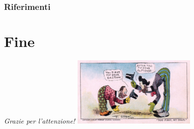 \documentclass{../libs/presentation_format}
\begin{document}

\begin{frame}[allowframebreaks]
    \frametitle{Riferimenti}
    \printbibliography
\end{frame}

\section{Fine}
\begin{frame}{}
	\huge\emph{Grazie per l'attenzione!}
	\newline
	\vfill
	\hfill\includegraphics[width=6cm]{../libs/alphonse-gaston-regards}
\end{frame}
\end{document}

